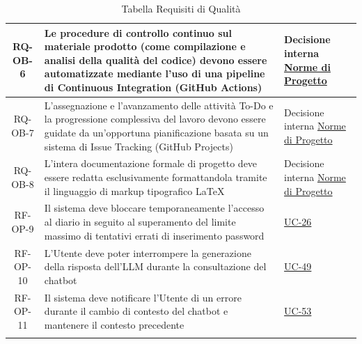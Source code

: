\documentclass[a4paper,12pt]{article}
\begin{document}
\begin{center}
\begin{longtable}{|c|p{8.5cm}|>{\centering\arraybackslash}p{4cm}|}
\hline
\rowcolor{gray!20}
RQ-OB-6 & Le procedure di controllo continuo sul materiale prodotto (come compilazione e analisi della qualità del codice) devono essere automatizzate mediante l'uso di una pipeline di Continuous Integration (GitHub Actions) & Decisione interna \href{https://swe-bitbybit.github.io/SWE-docs/docs/RTB/documenti_interni/norme_di_progetto.pdf}{Norme di Progetto} \\
\hline
\rowcolor{white}
RQ-OB-7 & L'assegnazione e l'avanzamento delle attività To-Do e la progressione complessiva del lavoro devono essere guidate da un'opportuna pianificazione basata su un sistema di Issue Tracking (GitHub Projects) & Decisione interna \href{https://swe-bitbybit.github.io/SWE-docs/docs/RTB/documenti_interni/norme_di_progetto.pdf}{Norme di Progetto} \\
\hline
\rowcolor{gray!20}
RQ-OB-8 & L'intera documentazione formale di progetto deve essere redatta esclusivamente formattandola tramite il linguaggio di markup tipografico \LaTeX & Decisione interna \href{https://swe-bitbybit.github.io/SWE-docs/docs/RTB/documenti_interni/norme_di_progetto.pdf}{Norme di Progetto} \\
\hline
\rowcolor{white}
RF-OP-9 & Il sistema deve bloccare temporaneamente l'accesso al diario in seguito al superamento del limite massimo di tentativi errati di inserimento password & \hyperref[subsec:UC-26]{UC-26} \\
\hline
\rowcolor{gray!20}
RF-OP-10 & L'Utente deve poter interrompere la generazione della risposta dell'LLM durante la consultazione del chatbot & \hyperref[sec:UC-49]{UC-49} \\
\hline
\rowcolor{white}
RF-OP-11 & Il sistema deve notificare l'Utente di un errore durante il cambio di contesto del chatbot e mantenere il contesto precedente & \hyperref[sec:UC-53]{UC-53} \\
\hline
\caption{Tabella Requisiti di Qualità} \label{tab:requisiti_qualita} \\
\end{longtable}
\end{center}
\end{document}
